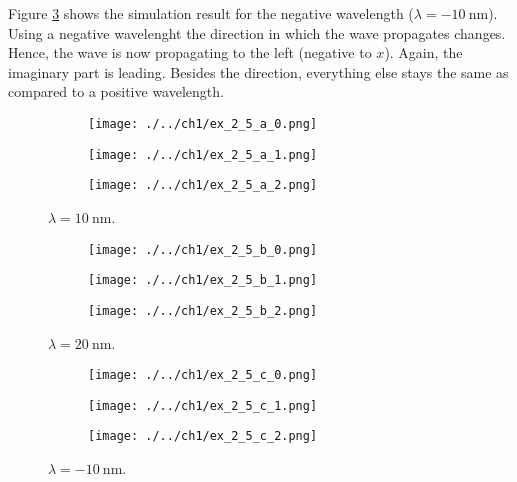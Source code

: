 Figure \ref{fig:ex_2_5_c} shows the simulation result for the negative
wavelength ($\lambda = \SI{-10}{\nano\m}$). Using a negative wavelenght the
direction in which the wave propagates changes. Hence, the wave is now
propagating to the left (negative to $x$). Again, the imaginary part is leading.
Besides the direction, everything else stays the same as compared to a
positive wavelength.

\newpage

\begin{figure}
	\centering
	\begin{subfigure}{1\linewidth}
		\texttt{[image: ./../ch1/ex\_2\_5\_a\_0.png]}
	\end{subfigure}

	\begin{subfigure}{1\linewidth}
		\texttt{[image: ./../ch1/ex\_2\_5\_a\_1.png]}
	\end{subfigure}
	
	\begin{subfigure}{1\linewidth}
		\texttt{[image: ./../ch1/ex\_2\_5\_a\_2.png]}
	\end{subfigure}
	
	\caption{$\lambda = \SI{10}{\nano\m}$.}
	\label{fig:ex_2_5_a}
\end{figure}

\newpage

\begin{figure}
	\centering
	\begin{subfigure}{1\linewidth}
		\texttt{[image: ./../ch1/ex\_2\_5\_b\_0.png]}
	\end{subfigure}

	\begin{subfigure}{1\linewidth}
		\texttt{[image: ./../ch1/ex\_2\_5\_b\_1.png]}
	\end{subfigure}
	
	\begin{subfigure}{1\linewidth}
		\texttt{[image: ./../ch1/ex\_2\_5\_b\_2.png]}
	\end{subfigure}
	
	\caption{$\lambda = \SI{20}{\nano\m}$.}
	\label{fig:ex_2_5_b}
\end{figure}

\newpage

\begin{figure}
	\centering
	\begin{subfigure}{1\linewidth}
		\texttt{[image: ./../ch1/ex\_2\_5\_c\_0.png]}
	\end{subfigure}

	\begin{subfigure}{1\linewidth}
		\texttt{[image: ./../ch1/ex\_2\_5\_c\_1.png]}
	\end{subfigure}
	
	\begin{subfigure}{1\linewidth}
		\texttt{[image: ./../ch1/ex\_2\_5\_c\_2.png]}
	\end{subfigure}
	
	\caption{$\lambda = \SI{-10}{\nano\m}$.}
	\label{fig:ex_2_5_c}
\end{figure}

\clearpage




